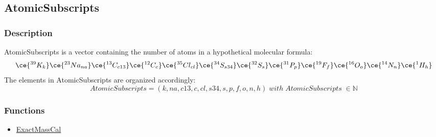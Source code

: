 \subsection{AtomicSubscripts}\label{AtomicSubscripts}
\subsubsection{Description}

AtomicSubscripts is a vector containing the number of atoms in a hypothetical molecular formula:
\begin{equation}
\ce{^{39}K_{k}} \ce{^{23}Na_{na}} \ce{^{13}C_{c13}} \ce{^{12}C_{c}} \ce{^{35}Cl_{cl}} \ce{^{34}S_{s34}} \ce{^{32}S_{s}} \ce{^{31}P_{p}} \ce{^{19}F_{f}} \ce{^{16}O_{o}} \ce{^{14}N_{n}} \ce{^{1}H_{h}}
\end{equation} 
The elements in AtomicSubscripts are organized accordingly: 
\begin{equation}
AtomicSubscripts=(k,na,c13,c,cl,s34,s,p,f,o,n,h) \; with \; AtomicSubscripts \;\in \mathbb{N}
\end{equation}
\subsubsection{Functions}
\begin{itemize}
\item \hyperref[ExactMassCal]{ExactMassCal}
\end{itemize}

